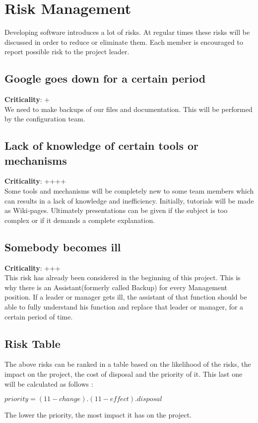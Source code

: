		\section{Risk Management}
			
			Developing software introduces a lot of risks. At regular times these risks will
			be discussed in order to reduce or eliminate them. Each member is encouraged to report
			possible risk to the project leader.
			
			\subsection{Google goes down for a certain period}
			\textbf{Criticality}: + \\
			We need to make backups of our files and documentation. This will be 
			performed by the configuration team.
			
			
			\subsection{Lack of knowledge of certain tools or mechanisms}
			\textbf{Criticality}: ++++ \\
			Some tools and mechanisms will be completely new to some team members which can
			results in a lack of knowledge and inefficiency. Initially, tutorials will be made
		    as Wiki-pages. Ultimately presentations can be given if the subject is too complex or
		 	if it demands a complete explanation. 
			
			\subsection{Somebody becomes ill}
			\textbf{Criticality}: +++ \\
			This risk has already been considered in the beginning of this 
			project. This is why there is an Assistant(formerly called Backup) for 
			every Management position. If a leader or manager gets ill, the assistant 
			of that function should be able to fully understand his 
			function and replace that leader or manager, for a certain period of time.
			
			\subsection{Risk Table}
			The above risks can be ranked in a table based on the likelihood of the risks, the
			impact on the project, the cost of disposal and the priority of it. 
			This last one will be calculated as follows :
			\begin{center}
			$ priority = (11 - change) . (11 - effect) . disposal $
			\end{center}
			The lower the priority, the most impact it has on the project. 
			

